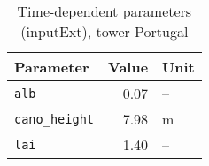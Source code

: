 \begin{table}[ht]
\centering
\caption{Time-dependent parameters (\textsf{inputExt}), tower Portugal} 
\label{tab:portugaltower_inputExt}
\begin{tabular}{lrl}
  \hline
Parameter & Value & Unit \\ 
  \hline
\verb!alb! & 0.07 & -- \\ 
  \verb!cano_height! & 7.98 & m \\ 
  \verb!lai! & 1.40 & -- \\ 
   \hline
\end{tabular}
\end{table}
